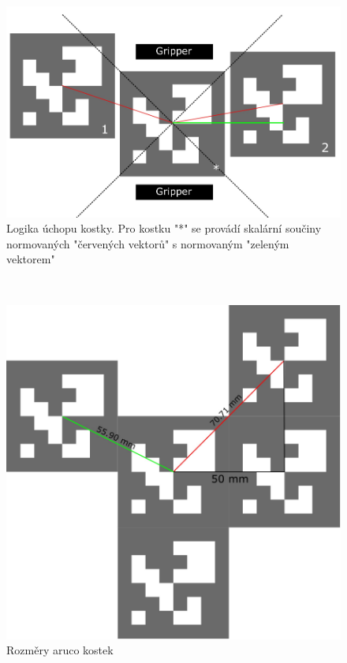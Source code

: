 \documentclass[journal,twoside,web]{ieeecolor}
\begin{document}
\begin{figure}[h!]
    \centering
    \hypertarget{scalar_logic}{}
    \includegraphics[width=\linewidth]{images/scalar}
    \caption{Logika úchopu kostky. Pro kostku "*" se provádí skalární součiny normovaných "červených vektorů"
        s normovaným "zeleným vektorem"}
    \label{fig:scalar_logic}
\end{figure}\\

\begin{figure}[h!]
    \centering
    \hypertarget{aruco_geometry}{}
    \includegraphics[width=0.8\linewidth]{aruco_geometry_cropped}
    \caption{Rozměry aruco kostek}
    \label{fig:aruco_geometry}
\end{figure}
\end{document}

